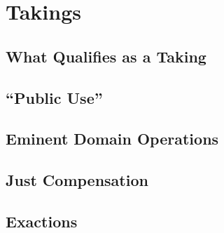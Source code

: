 \chapter{Takings}





%



\section{What Qualifies as a Taking}



\begin{questions}

\end{questions}


\section{``Public Use''}







\begin{questions}

\end{questions}



\section{Eminent Domain Operations}




\section{Just Compensation}





\section{Exactions}





\begin{questions}

\end{questions}
